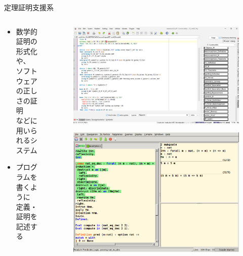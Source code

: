 \documentclass[17pt,aspectratio=169]{beamer}
\begin{document}
\begin{frame}{定理証明支援系}
    \begin{columns}
        \begin{column}{0.65\textwidth}
            \begin{itemize}
                \item 数学的証明の形式化や、\\ソフトウェアの正しさの証明\\などに用いられるシステム
                \item プログラムを書くように\\定義・証明を記述する
            \end{itemize}

        \end{column}
        \begin{column}{0.35\textwidth}
            \begin{figure}
                \includegraphics[width=1.0\linewidth]{./images/isabelle_editor.png}
            \end{figure}
            \begin{figure}
                \includegraphics[width=1.0\linewidth]{./images/coq-proving.png}
            \end{figure}


\end{column}
\end{columns}
\end{frame}
\end{document}
